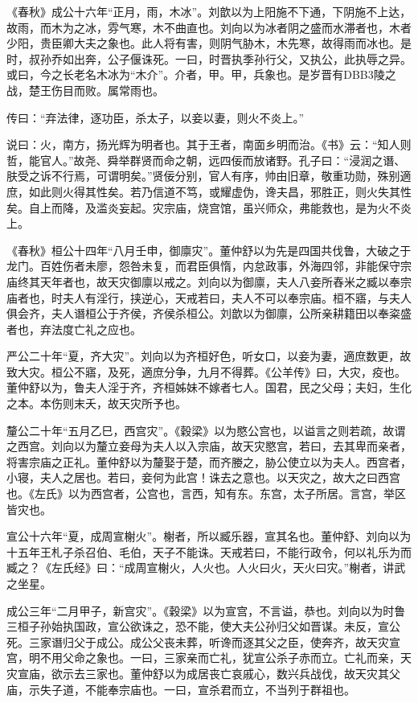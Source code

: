 \documentclass[]{article}
\begin{document}
《春秋》成公十六年``正月，雨，木冰''。刘歆以为上阳施不下通，下阴施不上达，故雨，而木为之冰，雰气寒，木不曲直也。刘向以为冰者阴之盛而水滞者也，木者少阳，贵臣卿大夫之象也。此人将有害，则阴气胁木，木先寒，故得雨而冰也。是时，叔孙乔如出奔，公子偃诛死。一曰，时晋执季孙行父，又执公，此执辱之异。或曰，今之长老名木冰为``木介''。介者，甲。甲，兵象也。是岁晋有DBB3陵之战，楚王伤目而败。属常雨也。

传曰：``弃法律，逐功臣，杀太子，以妾以妻，则火不炎上。''

说曰：火，南方，扬光辉为明者也。其于王者，南面乡明而治。《书》云：``知人则哲，能官人。''故尧、舜举群贤而命之朝，远四佞而放诸野。孔子曰：``浸润之谮、肤受之诉不行焉，可谓明矣。''贤佞分别，官人有序，帅由旧章，敬重功勋，殊别適庶，如此则火得其性矣。若乃信道不笃，或耀虚伪，谗夫昌，邪胜正，则火失其性矣。自上而降，及滥炎妄起。灾宗庙，烧宫馆，虽兴师众，弗能救也，是为火不炎上。

《春秋》桓公十四年``八月壬申，御廪灾''。董仲舒以为先是四国共伐鲁，大破之于龙门。百姓伤者未廖，怨咎未复，而君臣俱惰，内怠政事，外海四邻，非能保守宗庙终其天年者也，故天灾御廪以戒之。刘向以为御廪，夫人八妾所舂米之臧以奉宗庙者也，时夫人有淫行，挟逆心，天戒若曰，夫人不可以奉宗庙。桓不寤，与夫人俱会齐，夫人谮桓公于齐侯，齐侯杀桓公。刘歆以为御廪，公所亲耕籍田以奉粢盛者也，弃法度亡礼之应也。

严公二十年``夏，齐大灾''。刘向以为齐桓好色，听女口，以妾为妻，適庶数更，故致大灾。桓公不寤，及死，適庶分争，九月不得葬。《公羊传》曰，大灾，疫也。董仲舒以为，鲁夫人淫于齐，齐桓姊妹不嫁者七人。国君，民之父母；夫妇，生化之本。本伤则末夭，故天灾所予也。

釐公二十年``五月乙巳，西宫灾''。《穀梁》以为愍公宫也，以谥言之则若疏，故谓之西宫。刘向以为釐立妾母为夫人以入宗庙，故天灾愍宫，若曰，去其卑而亲者，将害宗庙之正礼。董仲舒以为釐娶于楚，而齐媵之，胁公使立以为夫人。西宫者，小寝，夫人之居也。若曰，妾何为此宫！诛去之意也。以天灾之，故大之曰西宫也。《左氏》以为西宫者，公宫也，言西，知有东。东宫，太子所居。言宫，举区皆灾也。

宣公十六年``夏，成周宣榭火''。榭者，所以臧乐器，宣其名也。董仲舒、刘向以为十五年王札子杀召伯、毛伯，天子不能诛。天戒若曰，不能行政令，何以礼乐为而臧之？《左氏经》曰：``成周宣榭火，人火也。人火曰火，天火曰灾。''榭者，讲武之坐星。

成公三年``二月甲子，新宫灾''。《穀梁》以为宣宫，不言谥，恭也。刘向以为时鲁三桓子孙始执国政，宣公欲诛之，恐不能，使大夫公孙归父如晋谋。未反，宣公死。三家谮归父于成公。成公父丧未葬，听谗而逐其父之臣，使奔齐，故天灾宣宫，明不用父命之象也。一曰，三家亲而亡礼，犹宣公杀子赤而立。亡礼而亲，天灾宣庙，欲示去三家也。董仲舒以为成居丧亡哀戚心，数兴兵战伐，故天灾其父庙，示失子道，不能奉宗庙也。一曰，宣杀君而立，不当列于群祖也。
\end{document}
